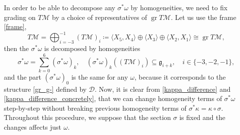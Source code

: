 \documentclass{amsart}
\theoremstyle{plain}
\theoremstyle{definition}
\theoremstyle{remark}
\newcommand{\mc}[1]{\mathcal{#1}}
\newcommand{\mfk}[1]{\mathfrak{#1}}
\newcommand{\on}[1]{\operatorname{#1}}
\begin{document}
In order to be able to decompose any $\sigma^* \omega$ by homogeneities, we need to fix grading on $T\mc{M}$ by a choice of representatives of $\on{gr} T\mc{M}$. Let us use the frame \eqref{frame},
%
\begin{equation}\label{grading_on_TM}
    T\mc{M} = \bigoplus_{i= -3}^{-1} (T\mc{M})_{i} \coloneqq \langle X_5, X_4 \rangle \oplus \langle X_3 \rangle \oplus \langle X_2, X_1 \rangle \cong \on{gr}T\mc{M},
\end{equation}
%
then the $\sigma^*\omega$ is decomposed by homogeneities
%
\begin{equation}\label{omega_homogeneities}
    \sigma^*\omega = \sum_{k=0}^6 (\sigma^*\omega)_k, \quad (\sigma^*\omega)_k \left( (T\mc{M})_i \right) \subseteq \mfk{g}_{i+k}, \quad i\in \{-3,-2,-1\},
\end{equation}
%
and the part $(\sigma^*\omega)_0$ is the same for any $\omega$, because it corresponds to the structure \eqref{gr_g-} defined by $\mc{D}$. Now, it is clear from \eqref{kappa_difference} and \eqref{kappa_difference_concretely}, that we can change homogeneity terms of $\sigma^*\omega$ step-by-step without breaking previous homogeneity terms of $\sigma^*\kappa = \kappa \circ \sigma$. Throughout this procedure, we suppose that the section $\sigma$ is fixed and the changes affects just $\omega$.
\end{document}
